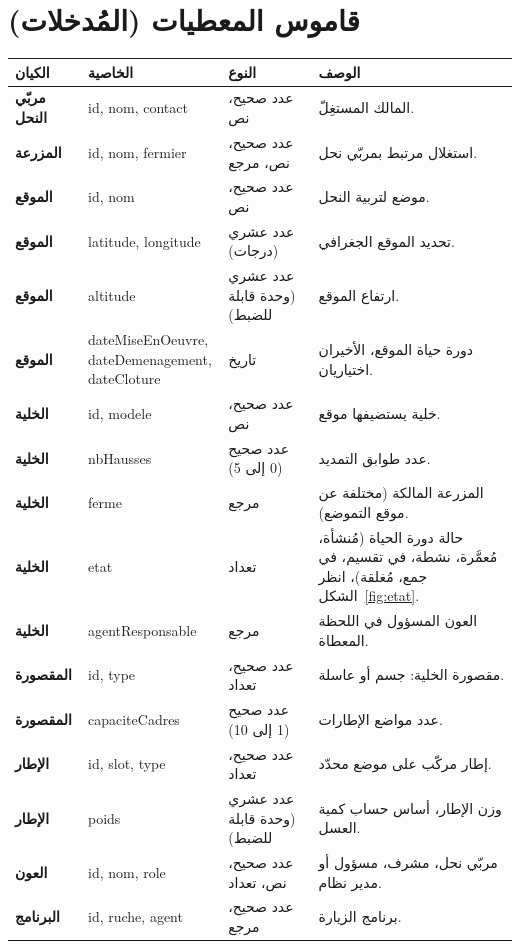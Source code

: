 \section{قاموس المعطيات (المُدخلات)}
\begin{xltabular}{\textwidth}{>{\bfseries}p{2.6cm} p{3.4cm} p{2.6cm} X}
\toprule
\textbf{الكيان} & \textbf{الخاصية} & \textbf{النوع} & \textbf{الوصف} \\
\midrule
\endhead
مربّي النحل & \textenglish{id, nom, contact} & عدد صحيح، نص & المالك المستغِلّ. \\
المزرعة & \textenglish{id, nom, fermier} & عدد صحيح، نص، مرجع & استغلال مرتبط بمربّي نحل. \\
الموقع & \textenglish{id, nom} & عدد صحيح، نص & موضع لتربية النحل. \\
الموقع & \textenglish{latitude, longitude} & عدد عشري (درجات) & تحديد الموقع الجغرافي. \\
الموقع & \textenglish{altitude} & عدد عشري (وحدة قابلة للضبط) & ارتفاع الموقع. \\
الموقع & \textenglish{dateMiseEnOeuvre, dateDemenagement, dateCloture} & تاريخ & دورة حياة الموقع، الأخيران اختياريان. \\
الخلية & \textenglish{id, modele} & عدد صحيح، نص & خلية يستضيفها موقع. \\
الخلية & \textenglish{nbHausses} & عدد صحيح (0 إلى 5) & عدد طوابق التمديد. \\
الخلية & \textenglish{ferme} & مرجع & المزرعة المالكة (مختلفة عن موقع التموضع). \\
الخلية & \textenglish{etat} & تعداد & حالة دورة الحياة (مُنشأة، مُعمَّرة، نشطة، في تقسيم، في جمع، مُغلقة)، انظر الشكل~\ref{fig:etat}. \\
الخلية & \textenglish{agentResponsable} & مرجع & العون المسؤول في اللحظة المعطاة. \\
المقصورة & \textenglish{id, type} & عدد صحيح، تعداد & مقصورة الخلية: جسم أو عاسلة. \\
المقصورة & \textenglish{capaciteCadres} & عدد صحيح (1 إلى 10) & عدد مواضع الإطارات. \\
الإطار & \textenglish{id, slot, type} & عدد صحيح، تعداد & إطار مركّب على موضع محدّد. \\
الإطار & \textenglish{poids} & عدد عشري (وحدة قابلة للضبط) & وزن الإطار، أساس حساب كمية العسل. \\
العون & \textenglish{id, nom, role} & عدد صحيح، نص، تعداد & مربّي نحل، مشرف، مسؤول أو مدير نظام. \\
البرنامج & \textenglish{id, ruche, agent} & عدد صحيح، مرجع & برنامج الزيارة. \\

\end{xltabular}
